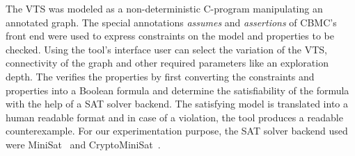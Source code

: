 %
%	
The VTS was modeled as a non-deterministic C-program manipulating an annotated graph. 
%
The special annotations \textit{assumes} and \textit{assertions} of CBMC's front end were used to express constraints on the model and properties to be checked. 
%
%		
Using the tool's interface user can select the variation of the VTS, connectivity of the graph and other required parameters like an exploration depth.
%
The {\sattool} verifies the properties by first converting the constraints and properties into a Boolean formula and determine the satisfiability of the formula with the help of a SAT solver backend.
%
The satisfying model is translated into a human readable format and in case of a violation, the tool produces a readable counterexample.
For our experimentation purpose, the SAT solver backend used were MiniSat~\cite{sorensson2005minisat} and CryptoMiniSat~\cite{soos2016cryptominisat}.


